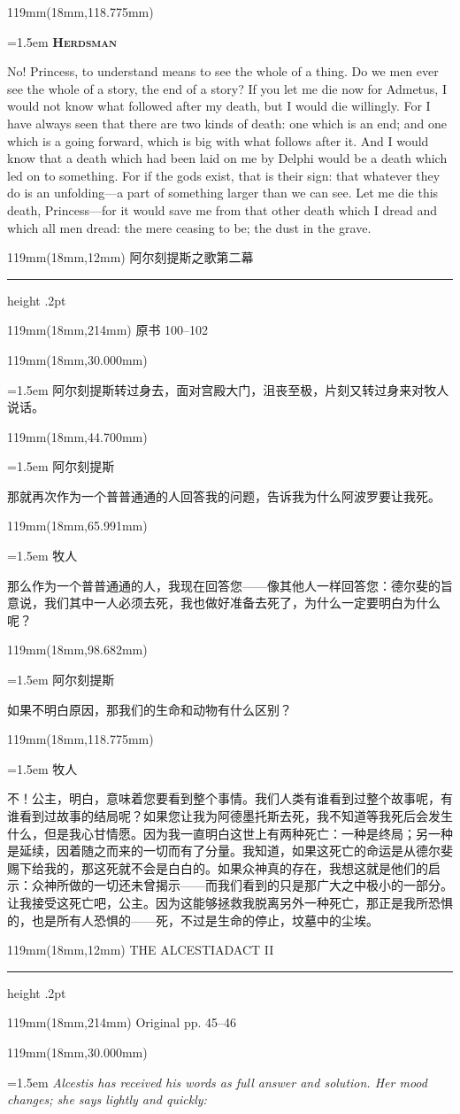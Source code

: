 \documentclass{article}
\newcommand{\ENsetup}{\normalfont\color{ink}\fontsize{11}{16.5}\selectfont\emergencystretch=1.5em}
\newcommand{\ZHsetup}{\normalfont\color{ink}\fontsize{10.5}{17}\selectfont\emergencystretch=1.5em}
\newcommand{\ENspeaker}[1]{{\fontsize{9.8}{13}\selectfont\scshape\bfseries #1}\par\vspace{3pt}}
\newcommand{\ZHspeaker}[1]{{\hei\fontsize{10.3}{13}\selectfont #1}\par\vspace{3pt}}
\newcommand{\Block}[3]{\begin{textblock*}{119mm}(18mm,#1mm){#2 #3\par}\end{textblock*}}
\newcommand{\Heading}[3]{%
  \begin{textblock*}{119mm}(18mm,12mm)
    \color{quiet}\fontsize{7.5}{10}\selectfont
    #1\hfill #2\par\vspace{3mm}\hrule height .2pt
  \end{textblock*}
  \begin{textblock*}{119mm}(18mm,214mm)
    \color{quiet}\fontsize{7}{10}\selectfont #3\hfill\thepage
  \end{textblock*}
}
\begin{document}
\Block{118.775}{\ENsetup}{\ENspeaker{Herdsman}
No! Princess, to understand means to see the whole of a thing. Do we men ever see the whole of a story, the end of a story? If you let me die now for Admetus, I would not know what followed after my death, but I would die willingly. For I have always seen that there are two kinds of death: one which is an end; and one which is a going forward, which is big with what follows after it. And I would know that a death which had been laid on me by Delphi would be a death which led on to something. For if the gods exist, that is their sign: that whatever they do is an unfolding—a part of something larger than we can see. Let me die this death, Princess—for it would save me from that other death which I dread and which all men dread: the mere ceasing to be; the dust in the grave.\par}
\newpage
\null
\Heading{阿尔刻提斯之歌}{第二幕}{原书 100–102}
\Block{30.000}{\ZHsetup}{\kai 阿尔刻提斯转过身去，面对宫殿大门，沮丧至极，片刻又转过身来对牧人说话。\par }
\Block{44.700}{\ZHsetup}{\ZHspeaker{阿尔刻提斯}那就再次作为一个普普通通的人回答我的问题，告诉我为什么阿波罗要让我死。\par }
\Block{65.991}{\ZHsetup}{\ZHspeaker{牧人}{\kai （仍然带着一些恼怒）}那么作为一个普普通通的人，我现在回答您——像其他人一样回答您：德尔斐的旨意说，我们其中一人必须去死，我也做好准备去死了，为什么一定要明白为什么呢？\par }
\Block{98.682}{\ZHsetup}{\ZHspeaker{阿尔刻提斯}如果不明白原因，那我们的生命和动物有什么区别？\par }
\Block{118.775}{\ZHsetup}{\ZHspeaker{牧人}不！公主，明白，意味着您要看到整个事情。我们人类有谁看到过整个故事呢，有谁看到过故事的结局呢？如果您让我为阿德墨托斯去死，我不知道等我死后会发生什么，但是我心甘情愿。因为我一直明白这世上有两种死亡：一种是终局；另一种是延续，因着随之而来的一切而有了分量。我知道，如果这死亡的命运是从德尔斐赐下给我的，那这死就不会是白白的。如果众神真的存在，我想这就是他们的启示：众神所做的一切还未曾揭示——而我们看到的只是那广大之中极小的一部分。让我接受这死亡吧，公主。因为这能够拯救我脱离另外一种死亡，那正是我所恐惧的，也是所有人恐惧的——死，不过是生命的停止，坟墓中的尘埃。\par }
\newpage
\null
\Heading{THE ALCESTIAD}{ACT II}{Original pp. 45–46}
\Block{30.000}{\ENsetup}{\itshape 
Alcestis has received his words as full answer and solution. Her mood changes; she says lightly and quickly:\par}
\end{document}
